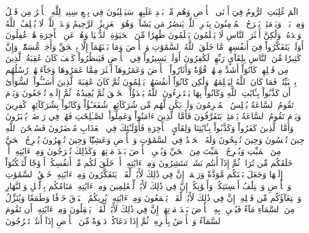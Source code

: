 الٓمٓ
غُلِبَتِ ٱلرُّومُ
فِيٓ أَدۡنَى ٱلۡأَرۡضِ وَهُم مِّنۢ بَعۡدِ غَلَبِهِمۡ سَيَغۡلِبُونَ
فِي بِضۡعِ سِنِينَۗ لِلَّهِ ٱلۡأَمۡرُ مِن قَبۡلُ وَمِنۢ بَعۡدُۚ وَيَوۡمَئِذٖ يَفۡرَحُ ٱلۡمُؤۡمِنُونَ
بِنَصۡرِ ٱللَّهِۚ يَنصُرُ مَن يَشَآءُۖ وَهُوَ ٱلۡعَزِيزُ ٱلرَّحِيمُ
وَعۡدَ ٱللَّهِۖ لَا يُخۡلِفُ ٱللَّهُ وَعۡدَهُۥ وَلَٰكِنَّ أَكۡثَرَ ٱلنَّاسِ لَا يَعۡلَمُونَ
يَعۡلَمُونَ ظَٰهِرٗا مِّنَ ٱلۡحَيَوٰةِ ٱلدُّنۡيَا وَهُمۡ عَنِ ٱلۡأٓخِرَةِ هُمۡ غَٰفِلُونَ
أَوَلَمۡ يَتَفَكَّرُواْ فِيٓ أَنفُسِهِمۗ مَّا خَلَقَ ٱللَّهُ ٱلسَّمَٰوَٰتِ وَٱلۡأَرۡضَ وَمَا بَيۡنَهُمَآ إِلَّا بِٱلۡحَقِّ وَأَجَلٖ مُّسَمّٗىۗ وَإِنَّ كَثِيرٗا مِّنَ ٱلنَّاسِ بِلِقَآيِٕ رَبِّهِمۡ لَكَٰفِرُونَ
أَوَلَمۡ يَسِيرُواْ فِي ٱلۡأَرۡضِ فَيَنظُرُواْ كَيۡفَ كَانَ عَٰقِبَةُ ٱلَّذِينَ مِن قَبۡلِهِمۡۚ كَانُوٓاْ أَشَدَّ مِنۡهُمۡ قُوَّةٗ وَأَثَارُواْ ٱلۡأَرۡضَ وَعَمَرُوهَآ أَكۡثَرَ مِمَّا عَمَرُوهَا وَجَآءَتۡهُمۡ رُسُلُهُم بِٱلۡبَيِّنَٰتِۖ فَمَا كَانَ ٱللَّهُ لِيَظۡلِمَهُمۡ وَلَٰكِن كَانُوٓاْ أَنفُسَهُمۡ يَظۡلِمُونَ
ثُمَّ كَانَ عَٰقِبَةَ ٱلَّذِينَ أَسَـٰٓـُٔواْ ٱلسُّوٓأَىٰٓ أَن كَذَّبُواْ بِـَٔايَٰتِ ٱللَّهِ وَكَانُواْ بِهَا يَسۡتَهۡزِءُونَ
ٱللَّهُ يَبۡدَؤُاْ ٱلۡخَلۡقَ ثُمَّ يُعِيدُهُۥ ثُمَّ إِلَيۡهِ تُرۡجَعُونَ
وَيَوۡمَ تَقُومُ ٱلسَّاعَةُ يُبۡلِسُ ٱلۡمُجۡرِمُونَ
وَلَمۡ يَكُن لَّهُم مِّن شُرَكَآئِهِمۡ شُفَعَـٰٓؤُاْ وَكَانُواْ بِشُرَكَآئِهِمۡ كَٰفِرِينَ
وَيَوۡمَ تَقُومُ ٱلسَّاعَةُ يَوۡمَئِذٖ يَتَفَرَّقُونَ
فَأَمَّا ٱلَّذِينَ ءَامَنُواْ وَعَمِلُواْ ٱلصَّـٰلِحَٰتِ فَهُمۡ فِي رَوۡضَةٖ يُحۡبَرُونَ
وَأَمَّا ٱلَّذِينَ كَفَرُواْ وَكَذَّبُواْ بِـَٔايَٰتِنَا وَلِقَآيِٕ ٱلۡأٓخِرَةِ فَأُوْلَـٰٓئِكَ فِي ٱلۡعَذَابِ مُحۡضَرُونَ
فَسُبۡحَٰنَ ٱللَّهِ حِينَ تُمۡسُونَ وَحِينَ تُصۡبِحُونَ
وَلَهُ ٱلۡحَمۡدُ فِي ٱلسَّمَٰوَٰتِ وَٱلۡأَرۡضِ وَعَشِيّٗا وَحِينَ تُظۡهِرُونَ
يُخۡرِجُ ٱلۡحَيَّ مِنَ ٱلۡمَيِّتِ وَيُخۡرِجُ ٱلۡمَيِّتَ مِنَ ٱلۡحَيِّ وَيُحۡيِ ٱلۡأَرۡضَ بَعۡدَ مَوۡتِهَاۚ وَكَذَٰلِكَ تُخۡرَجُونَ
وَمِنۡ ءَايَٰتِهِۦٓ أَنۡ خَلَقَكُم مِّن تُرَابٖ ثُمَّ إِذَآ أَنتُم بَشَرٞ تَنتَشِرُونَ
وَمِنۡ ءَايَٰتِهِۦٓ أَنۡ خَلَقَ لَكُم مِّنۡ أَنفُسِكُمۡ أَزۡوَٰجٗا لِّتَسۡكُنُوٓاْ إِلَيۡهَا وَجَعَلَ بَيۡنَكُم مَّوَدَّةٗ وَرَحۡمَةًۚ إِنَّ فِي ذَٰلِكَ لَأٓيَٰتٖ لِّقَوۡمٖ يَتَفَكَّرُونَ
وَمِنۡ ءَايَٰتِهِۦ خَلۡقُ ٱلسَّمَٰوَٰتِ وَٱلۡأَرۡضِ وَٱخۡتِلَٰفُ أَلۡسِنَتِكُمۡ وَأَلۡوَٰنِكُمۡۚ إِنَّ فِي ذَٰلِكَ لَأٓيَٰتٖ لِّلۡعَٰلِمِينَ
وَمِنۡ ءَايَٰتِهِۦ مَنَامُكُم بِٱلَّيۡلِ وَٱلنَّهَارِ وَٱبۡتِغَآؤُكُم مِّن فَضۡلِهِۦٓۚ إِنَّ فِي ذَٰلِكَ لَأٓيَٰتٖ لِّقَوۡمٖ يَسۡمَعُونَ
وَمِنۡ ءَايَٰتِهِۦ يُرِيكُمُ ٱلۡبَرۡقَ خَوۡفٗا وَطَمَعٗا وَيُنَزِّلُ مِنَ ٱلسَّمَآءِ مَآءٗ فَيُحۡيِۦ بِهِ ٱلۡأَرۡضَ بَعۡدَ مَوۡتِهَآۚ إِنَّ فِي ذَٰلِكَ لَأٓيَٰتٖ لِّقَوۡمٖ يَعۡقِلُونَ
وَمِنۡ ءَايَٰتِهِۦٓ أَن تَقُومَ ٱلسَّمَآءُ وَٱلۡأَرۡضُ بِأَمۡرِهِۦۚ ثُمَّ إِذَا دَعَاكُمۡ دَعۡوَةٗ مِّنَ ٱلۡأَرۡضِ إِذَآ أَنتُمۡ تَخۡرُجُونَ
